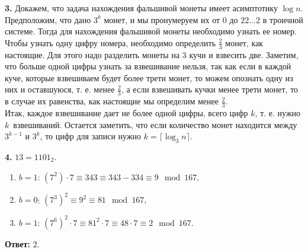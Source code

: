 \documentclass{article}
\begin{document}
\medskip
\textbf{3. }
Докажем, что задача нахождения фальшивой монеты имеет асимптотику \(
\log n \).
\\
Предположим, что дано \( 3^k \) монет, и мы пронумеруем их от
\( 0 \) до \( 22\ldots2 \) в троичной системе. Тогда для нахождения
фальшивой монеты необходимо узнать ее номер. Чтобы узнать одну цифру
номера, необходимо определить \( \frac 2 3 \) монет, как настоящие.
Для этого надо разделить монеты на 3 кучи и взвесить две. Заметим,
что больше одной цифры узнать за взвешивание нельзя, так как если в
каждой куче, которые взвешиваем будет более трети монет, то можем
опознать одну из них и оставшуюся, т. е. менее \( \frac 2 3 \), а
если взвешивать кучки менее трети монет, то в случае их равенства,
как настоящие мы определим менее \( \frac 2 3 \).
\\
Итак, каждое взвешивание дает не более одной цифры, всего цифр \( k
\), т. е. нужно \( k \)\ взвешиваний. Остается заметить, что если
количество монет находится между \( 3^{k-1} \) и \( 3^{k} \), то цифр
для записи нужно \( k = \lceil \log_3 n\rceil \).

\textbf{4.} \( 13 = 1101_2. \)
\begin{enumerate}
  \item\( b=1 \): \( \left(7^2\right)\cdot 7 \equiv 343 \equiv 343 - 334 \equiv
    9 \mod 167, \)
  \item\( b = 0\): \( \left(7^3\right)^2 \equiv 9^2 \equiv 81 \mod 167, \)
  \item\( b = 1\): \( \left(7^6\right)^2 \cdot 7 \equiv 81^2 \cdot 7
    \equiv 48\cdot 7 \equiv 2 \mod 167 \).
\end{enumerate}

\textbf{Ответ: }2.
\medskip
\end{document}
